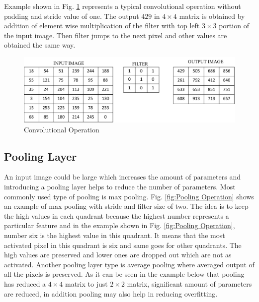 \documentclass[11pt]{article}
\begin{document}
Example shown in Fig. \ref{fig:Convolutional Operation} represents a typical convolutional operation without padding and stride value of one. The output $429$ in $4 \times 4$ matrix is obtained by addition of element wise multiplication of the filter with top left $3 \times 3$ portion of the input image. Then filter jumps to the next pixel and other values are obtained the same way.

\begin{figure}[H]
	\centering
	\includegraphics[width=.6\linewidth]{files/cnn_architecture/conv.png}
	\caption{Convolutional Operation}
	\label{fig:Convolutional Operation}
\end{figure}

\subsection{Pooling Layer}
An input image could be large which increases the amount of parameters and introducing a pooling layer helps to reduce the number of parameters. Most commonly used type of pooling is max pooling. Fig. \ref{fig:Pooling Operation} shows an example of max pooling with stride and filter size of two. The idea is to keep the high values in each quadrant because the highest number represents a particular feature and in the example shown in Fig. \ref{fig:Pooling Operation}, number six is the highest value in this quadrant. It means that the most activated pixel in this quadrant is six and same goes for other quadrants. The high values are preserved and lower ones are dropped out which are not as activated. Another pooling layer type is average pooling where averaged output of all the pixels is preserved. As it can be seen in the example below that pooling has reduced a $4 \times 4$ matrix to just $2 \times 2$ matrix, significant amount of parameters are reduced, in addition pooling may also help in reducing overfitting.
\end{document}
